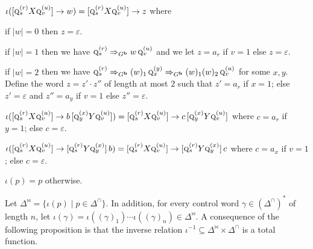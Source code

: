 \documentclass[final]{llncs}
\def\len#1{{\vert{#1}\vert}}
\def\prod{\Delta}
\def\pat{{\mathbf{b}}}
\begin{document}
\begin{compactitem}
\item \( \iota([\textsc{q}^{(r)}_{s} X \textsc{q}^{(u)}_{v}] \rightarrow w) = [\textsc{q}^{(r)}_{s} X \textsc{q}^{(u)}_{v}] \rightarrow z\) where
\begin{compactenum}
	\item if \(\len{w}=0\) then \(z=\varepsilon\). 
	\item if \(\len{w}=1\) then we have \(\textsc{q}^{(r)}_{s}\Rightarrow_{G^\pat} w\, \textsc{q}^{(u)}_{v}\) and we let \(z=a_r\) if \(v=1\) else \(z=\varepsilon\).  
	\item if \(\len{w}=2\) then we have \(\textsc{q}^{(r)}_{s}\Rightarrow_{G^\pat} (w)_{1}\, \textsc{q}^{(y)}_{x} \Rightarrow_{G^\pat} (w)_{1} (w)_{2}\,  \textsc{q}^{(u)}_{v} \) for some \(x,y\).
		Define the word \(z = z'\cdot z''\) of length at most \(2\) such that \( z'=a_r\) if \(x=1\); else \(z'=\varepsilon\) and \(z''=a_y\) if \(v=1\) else \(z''=\varepsilon\).
\end{compactenum}

\item \( \iota([\textsc{q}^{(r)}_{s} X \textsc{q}^{(u)}_v] \rightarrow b \,
	[\textsc{q}^{(x)}_{y} Y \textsc{q}^{(u)}_v]) = [\textsc{q}^{(r)}_{s} X
	\textsc{q}^{(u)}_v] \rightarrow c \, [\textsc{q}^{(x)}_{y} Y
	\textsc{q}^{(u)}_v] \) where \(c=a_r\) if \(y=1\); else \(c=\varepsilon\).

\item \( \iota([\textsc{q}^{(r)}_{s} X \textsc{q}^{(u)}_v] \rightarrow
	[\textsc{q}^{(r)}_{s} Y \textsc{q}^{(x)}_y]\, b) = [\textsc{q}^{(r)}_{s} X
	\textsc{q}^{(u)}_v] \rightarrow [\textsc{q}^{(r)}_{s} Y
	\textsc{q}^{(x)}_y]\, c\) where \(c=a_x\) if \(v=1\); else \(c=\varepsilon\).
\item \(\iota(p)=p\) otherwise.
\end{compactitem}
Let $\prod^\bowtie = \{\iota(p) \mid p \in \prod^\cap\}$.  In
addition, for every control word \(\gamma\in (\Delta^\cap)^*\) of
length \(n\), let $\iota(\gamma) = \iota( (\gamma)_1 ) \cdots \iota(
(\gamma)_n ) \in \prod^\bowtie$.  A consequence of the following
proposition is that the inverse relation $\iota^{-1} \subseteq
\prod^\bowtie \times \prod^\cap$ is a total function. 
\end{document}
